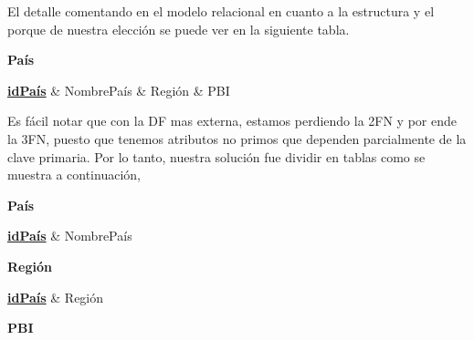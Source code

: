 \documentclass[10pt,a4paper]{article}
\begin{document}
El detalle comentando en el modelo relacional en cuanto a la estructura y el porque de nuestra elección se puede ver en la siguiente tabla. \vspace{0.3cm}

\textbf{País} 
 \vspace{0.1cm}

\begin{dependency}
    \raggedright
    \begin{deptext}[TxtBook] %
        \textbf{\underline{idPaís}}  \& NombrePaís \& Región \& PBI  \\
    \end{deptext}
\end{dependency} \vspace{0.3cm}

Es fácil notar que con la DF mas externa, estamos perdiendo la 2FN y por ende la 3FN, puesto que tenemos atributos no primos que dependen parcialmente de la clave primaria.
Por lo tanto, nuestra solución fue dividir en tablas como se muestra a continuación, \vspace{0.3cm}


\textbf{País} 
\vspace{0.1cm}

\begin{dependency}
    \raggedright
    \begin{deptext}[TxtBook] %
        \textbf{\underline{idPaís}}  \& NombrePaís\\
    \end{deptext}
\end{dependency} \vspace{0.3cm}

\textbf{Región} 
\vspace{0.1cm}

\begin{dependency}
    \raggedright
    \begin{deptext}[TxtBook] %
        \textbf{\underline{idPaís}} \& Región  \\
    \end{deptext}
\end{dependency} \vspace{0.3cm}


\textbf{PBI} 
\vspace{0.1cm}
\end{document}
